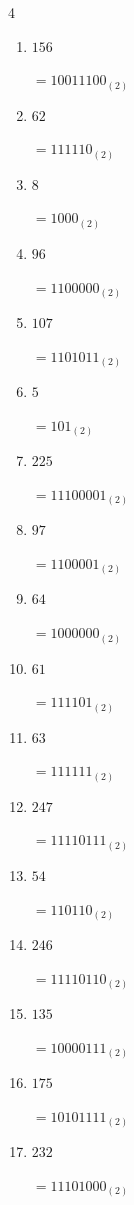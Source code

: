 \begin{multicols}{4}
\begin{enumerate}
        $=11000011_{(2)}$

  \item $156$

        $=10011100_{(2)}$

  \item $62$

        $=111110_{(2)}$

\columnbreak %

  \item $8$

        $=1000_{(2)}$

  \item $96$

        $=1100000_{(2)}$

  \item $107$

        $=1101011_{(2)}$

  \item $5$

        $=101_{(2)}$

  \item $225$

        $=11100001_{(2)}$

  \item $97$

        $=1100001_{(2)}$

  \item $64$

        $=1000000_{(2)}$

  \item $61$

        $=111101_{(2)}$

  \item $63$

        $=111111_{(2)}$

  \item $247$

        $=11110111_{(2)}$

  \item $54$

        $=110110_{(2)}$

  \item $246$

        $=11110110_{(2)}$

  \item $135$

        $=10000111_{(2)}$

  \item $175$

        $=10101111_{(2)}$

  \item $232$

        $=11101000_{(2)}$

\end{enumerate}
\end{multicols}
